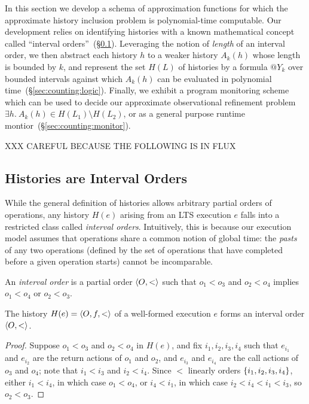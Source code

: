 In this section we develop a schema of approximation functions for which the
approximate history inclusion problem is polynomial-time computable. Our
development relies on identifying histories with a known mathematical concept
called ``interval orders''~(\S\ref{sec:counting:intervals}). Leveraging the
notion of \emph{length} of an interval order, we then abstract each history $h$
to a weaker history $A_k(h)$ whose length is bounded by $k$, and
represent the set $H(L)$ of histories by a formula $@Y_k$ over bounded
intervals against which $A_k(h)$ can be evaluated in polynomial
time~(\S\ref{sec:counting:logic}). Finally, we exhibit a program monitoring
scheme which can be used to decide our approximate observational refinement
problem $\exists h.\ A_k(h) \in H(L_1) \setminus H(L_2)$, or as a general
purpose runtime montior~(\S\ref{sec:counting:monitor}).

XXX CAREFUL BECAUSE THE FOLLOWING IS IN FLUX


\subsection{Histories are Interval Orders}
\label{sec:counting:intervals}

While the general definition of histories allows arbitrary partial orders of
operations, any history $H(e)$ arising from an LTS execution $e$ falls into a
restricted class called \emph{interval orders}. Intuitively, this is because
our execution model assumes that operations share a common notion of global
time: the \emph{pasts} of any two operations (defined by the set of operations
that have completed before a given operation starts) cannot be incomparable.

\begin{definition}

  An \emph{interval order} is a partial order $\left\langle {O,<} \right\rangle$ such that
  $o_1 < o_3$ and $o_2 < o_4$ implies $o_1 < o_4$ or $o_2 < o_3$.

\end{definition}

\begin{lemma}
  \label{lem:intervals}

  The history $H(e) = \left\langle {O,f,<} \right\rangle$ of a well-formed execution $e$ forms an
  interval order $\left\langle {O,<} \right\rangle$.

\end{lemma}

\begin{proof}

  Suppose $o_1 < o_3$ and $o_2 < o_4$ in $H(e)$, and fix $i_1, i_2, i_3, i_4$
  such that $e_{i_1}$ and $e_{i_2}$ are the return actions of $o_1$ and $o_2$,
  and $e_{i_3}$ and $e_{i_4}$ are the call actions of $o_3$ and $o_4$; note
  that $i_1 < i_3$ and $i_2 < i_4$. Since $<$ linearly orders ${\{ i_1, i_2,
  i_3, i_4 \}}$, either $i_1 < i_4$, in which case $o_1 < o_4$, or $i_4 < i_1$, in
  which case $i_2 < i_4 < i_1 < i_3$, so $o_2 < o_3$.

\end{proof}

